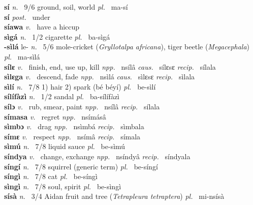 {\bfseries sí}  {\itshape n.~} 9/6 ground, soil, world {\itshape pl.~} ma-sí    \\ 
{\bfseries sí}  {\itshape post.~} under    \\ 
{\bfseries síawa}  {\itshape v.~} have a hiccup    \\ 
{\bfseries sìgá}  {\itshape n.~} 1/2 cigarette {\itshape pl.~} ba-sìgá    \\ 
{\bfseries -sìlá} le- {\itshape n.~} 5/6 mole-cricket ({\itshape Gryllotalpa africana}), tiger beetle ({\itshape Megacephala}) {\itshape pl.~} ma-sìlá    \\ 
{\bfseries sílɛ}  {\itshape v.~} finish, end, use up, kill   {\itshape npp.~} nsílâ {\itshape caus.~} sílɛsɛ  {\itshape recip.~} sílala  \\ 
{\bfseries sìlɛga}  {\itshape v.~} descend, fade   {\itshape npp.~} nsìlá {\itshape caus.~} sìlɛsɛ {\itshape recip.~} sìlala  \\ 
{\bfseries sìlí}  {\itshape n.~} 7/8 1) hair 2) spark (bé béyí) {\itshape pl.~} be-sìlí    \\ 
{\bfseries sílífàzì}  {\itshape n.~} 1/2 sandal {\itshape pl.~} ba-sílífàzì    \\ 
{\bfseries sílɔ}  {\itshape v.~} rub, smear, paint   {\itshape npp.~} nsílâ {\itshape recip.~} sílala  \\ 
{\bfseries símasa}  {\itshape v.~} regret   {\itshape npp.~} nsímásâ  \\ 
{\bfseries sìmbɔ}  {\itshape v.~} drag   {\itshape npp.~} nsìmbá {\itshape recip.~} sìmbala  \\ 
{\bfseries símɛ}  {\itshape v.~} respect   {\itshape npp.~} nsímâ {\itshape recip.~} símala  \\ 
{\bfseries sìmú}  {\itshape n.~} 7/8 liquid sauce {\itshape pl.~} be-sìmú    \\ 
{\bfseries síndya}  {\itshape v.~} change, exchange   {\itshape npp.~} nsíndyâ {\itshape recip.~} síndyala  \\ 
{\bfseries síngí}  {\itshape n.~} 7/8 squirrel (generic term) {\itshape pl.~} be-síngí    \\ 
{\bfseries síngì}  {\itshape n.~} 7/8 cat {\itshape pl.~} be-síngì    \\ 
{\bfseries sìngì}  {\itshape n.~} 7/8 soul, spirit {\itshape pl.~} be-sìngì    \\ 
{\bfseries sísà}  {\itshape n.~} 3/4 Aidan fruit and tree ({\itshape Tetrapleura tetraptera}) {\itshape pl.~} mi-nsísà    \\ 
